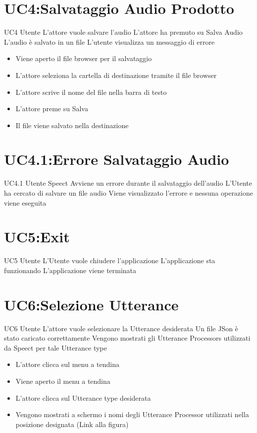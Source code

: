 \documentclass[../AnalisideiRequisiti.tex]{subfiles}
\begin{document}
\section{UC4:Salvataggio Audio Prodotto}
\UserCase
{UC4}
{Utente}
{}
{L'attore vuole salvare l'audio}
{L'attore ha premuto su Salva Audio}
{L'audio è salvato in un file}
{L'utente visualizza un messaggio di errore }
{
		\begin{itemize}
		\item{} Viene aperto il file browser per il salvataggio
		\item{} L'attore seleziona la cartella di destinazione tramite il file browser 
		\item{} L'attore scrive il nome del file nella barra di testo
		\item{} L'attore preme su Salva 
		\item{} Il file viene salvato nella destinazione
\end{itemize}
}	

\section{UC4.1:Errore Salvataggio Audio}
\UserCase
{UC4.1}
{Utente}
{Speect}
{Avviene un errore durante il salvataggio dell'audio}
{L'Utente ha cercato di salvare un file audio}
{Viene visualizzato l'errore e nessuna operazione viene eseguita}
{}
{}

\section{UC5:Exit}
\UserCase
{UC5}
{Utente}
{}
{L'Utente vuole chiudere l'applicazione }
{L'applicazione sta funzionando}
{L'applicazione viene terminata}
{}
{
}

\section{UC6:Selezione Utterance}
\UserCase
{UC6}
{Utente}
{}
{L'attore vuole selezionare la Utterance desiderata }
{Un file JSon è stato caricato  correttamente }
{Vengono mostrati gli Utterance Processors utilizzati da Speect per tale Utterance type}
{}
{
	\begin{itemize}
		\item{} L'attore clicca sul menu a tendina
		\item{} Viene aperto il menu a tendina
		\item{} L'attore clicca sul Utterance type desiderata
		\item{} Vengono mostrati a schermo i nomi degli Utterance Processor utilizzati nella posizione designata (Link alla figura)
		
	\end{itemize}
}
\end{document}
